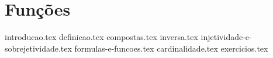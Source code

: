 \chapter{Funções}
{
    \newcommand{\chapterdir}{./sections/}
    
    {introducao.tex}
    {definicao.tex}
    {compostas.tex}
    {inversa.tex}
    {injetividade-e-sobrejetividade.tex}
    {formulas-e-funcoes.tex}
    {cardinalidade.tex}
    {exercicios.tex}
}